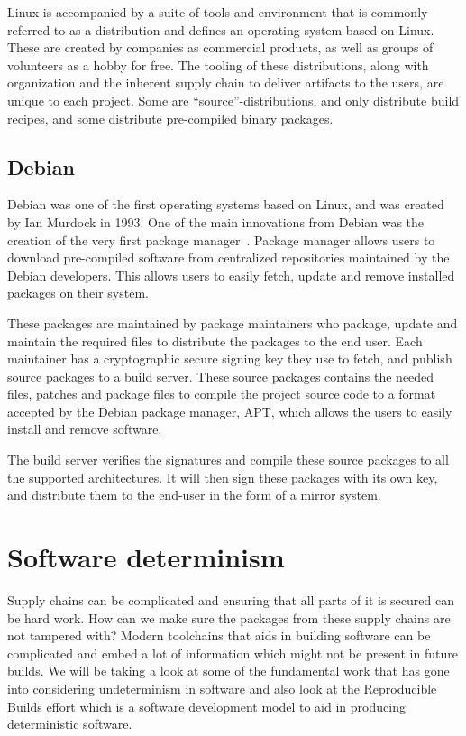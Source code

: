 \documentclass[../Main/thesis.tex]{subfiles}
\begin{document}
Linux is accompanied by a suite of tools and environment that is commonly
referred to as a distribution and defines an operating system based on
Linux. These are created by companies as commercial products, as well as groups
of volunteers as a hobby for free. The tooling of these distributions, along
with organization and the inherent supply chain to deliver artifacts to the
users, are unique to each project. Some are ``source''-distributions, and only
distribute build recipes, and some distribute pre-compiled binary packages.

\subsection*{Debian}
Debian was one of the first operating systems based on Linux, and was created by
Ian Murdock in 1993. One of the main innovations from Debian was the creation of
the very first package manager~\cite{debian-history}. Package manager allows
users to download pre-compiled software from centralized repositories maintained
by the Debian developers. This allows users to easily fetch, update and remove
installed packages on their system.

These packages are maintained by package maintainers who package, update and
maintain the required files to distribute the packages to the end user. Each
maintainer has a cryptographic secure signing key they use to fetch, and publish
source packages to a build server. These source packages contains the needed
files, patches and package files to compile the project source code to a format
accepted by the Debian package manager, APT, which allows the users to easily
install and remove software.

The build server verifies the signatures and compile these source packages to
all the supported architectures. It will then sign these packages with its own
key, and distribute them to the end-user in the form of a mirror system.


\section{Software determinism}\label{sec:reproducible_builds}
Supply chains can be complicated and ensuring that all parts of it is secured
can be hard work. How can we make sure the packages from these supply chains are
not tampered with? Modern toolchains that aids in building software can be
complicated and embed a lot of information which might not be present in future
builds. We will be taking a look at some of the fundamental work that has gone
into considering undeterminism in software and also look at the Reproducible
Builds effort which is a software development model to aid in producing
deterministic software.
\end{document}
